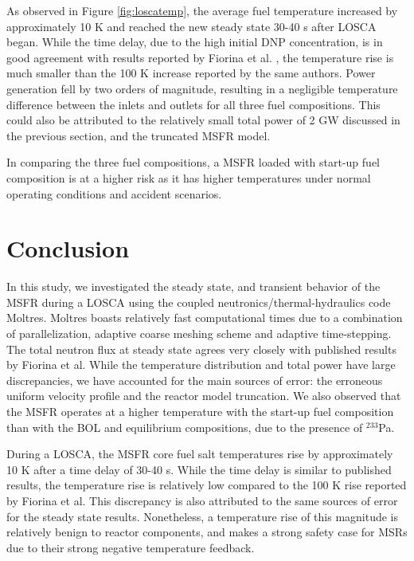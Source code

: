 \documentclass{anstrans}
\begin{document}
	As observed in Figure \ref{fig:loscatemp}, the average fuel temperature
	increased by approximately 10 K and reached the new steady state
	30-40 s after \gls{LOSCA} began. While the time delay, due to the high
	initial
	\gls{DNP} concentration, is in good agreement with results reported by
	Fiorina et al. \cite{fiorina_modelling_2014}, the temperature rise is much
	smaller than the 100 K increase reported by the same authors.
	Power generation fell by two orders of
	magnitude, resulting in a negligible temperature difference between the
	inlets and outlets for all three fuel compositions. This could also be
	attributed to the relatively small total power of 2 GW discussed in the
	previous section, and the truncated \gls{MSFR} model.
	
	In comparing the three fuel compositions, a \gls{MSFR} loaded with
	start-up fuel composition is at a higher risk as it has higher
	temperatures under normal operating conditions and accident scenarios.

\section{Conclusion}

	In this study, we investigated the steady state, and transient behavior of
	the \gls{MSFR} during a \gls{LOSCA}
	using the coupled neutronics/thermal-hydraulics code Moltres. Moltres
	boasts relatively fast computational times due to a combination of
	parallelization,
	adaptive coarse meshing scheme and adaptive time-stepping. The total
	neutron flux at steady state agrees very closely with published results by
	Fiorina et al. \cite{fiorina_modelling_2014} While the temperature
	distribution and total power have
	large discrepancies, we have accounted for the main sources of error:
	the erroneous uniform velocity profile and the reactor model truncation. We
	also observed that the \gls{MSFR} operates at a higher temperature with the
	start-up fuel composition than with the \gls{BOL} and equilibrium
	compositions, due to the presence of $^{233}$Pa.
	
	During a \gls{LOSCA}, the \gls{MSFR} core fuel salt temperatures rise by
	approximately 10 K after a time delay of 30-40 s. While the time delay is
	similar to published results, the temperature rise is relatively low
	compared to the 100 K rise reported by Fiorina et al.
	\cite{fiorina_modelling_2014} This discrepancy is also attributed to the
	same sources of error for the steady state results. Nonetheless, a
	temperature rise of
	this magnitude is relatively benign to reactor components, and makes
	a strong safety case for \glspl{MSR} due to their strong negative
	temperature feedback. 
	
\end{document}

